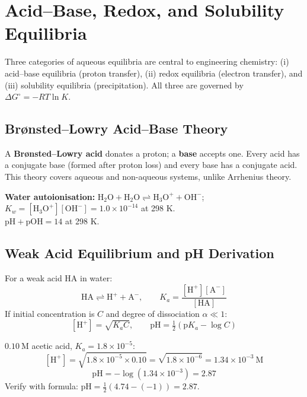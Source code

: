\documentclass[12pt,a4paper]{article}
\begin{document}
\section{Acid--Base, Redox, and Solubility Equilibria}

\begin{tcolorbox}[defbox]
Three categories of aqueous equilibria are central to engineering chemistry: (i) acid--base equilibria (proton transfer), (ii) redox equilibria (electron transfer), and (iii) solubility equilibria (precipitation). All three are governed by $\Delta G^\circ = -RT\ln K$.
\end{tcolorbox}

\subsection{Br\o{}nsted--Lowry Acid--Base Theory}
\begin{tcolorbox}[defbox]
A \textbf{Br\o{}nsted--Lowry acid} donates a proton; a \textbf{base} accepts one. Every acid has a conjugate base (formed after proton loss) and every base has a conjugate acid. This theory covers aqueous and non-aqueous systems, unlike Arrhenius theory.
\end{tcolorbox}

\textbf{Water autoionisation:} $\mathrm{H_2O + H_2O \rightleftharpoons H_3O^+ + OH^-}$; $K_w = [\mathrm{H_3O^+}][\mathrm{OH^-}] = 1.0\times10^{-14}$ at 298 K.\\
$\mathrm{pH} + \mathrm{pOH} = 14$ at 298 K.

\subsection{Weak Acid Equilibrium and pH Derivation}
For a weak acid HA in water:
\[
\mathrm{HA} \rightleftharpoons \mathrm{H^+} + \mathrm{A^-}, \qquad K_a = \frac{[\mathrm{H^+}][\mathrm{A^-}]}{[\mathrm{HA}]}
\]
If initial concentration is $C$ and degree of dissociation $\alpha \ll 1$:
\[
[\mathrm{H^+}] = \sqrt{K_a C}, \qquad \mathrm{pH} = \tfrac{1}{2}(\mathrm{p}K_a - \log C)
\]

\begin{tcolorbox}[examplebox, title={Solved Example: pH of Acetic Acid}]
$0.10\ \mathrm{M}$ acetic acid, $K_a = 1.8\times10^{-5}$:
\[
[\mathrm{H^+}] = \sqrt{1.8\times10^{-5}\times0.10} = \sqrt{1.8\times10^{-6}} = 1.34\times10^{-3}\ \mathrm{M}
\]
\[
\mathrm{pH} = -\log(1.34\times10^{-3}) = 2.87
\]
Verify with formula: $\mathrm{pH} = \tfrac12(4.74 - (-1)) = 2.87$. \checkmark
\end{tcolorbox}
\end{document}
